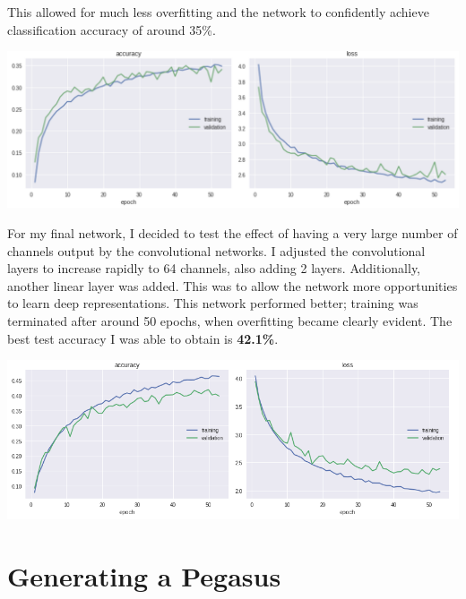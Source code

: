 \documentclass[11pt]{article}
\begin{document}
This allowed for much less overfitting and the network to confidently achieve classification accuracy of around 35\%.

     \begin{center} %
        \begin{minipage}{0.75\linewidth}
            \includegraphics[width=\linewidth]{accuracy7}
        \end{minipage}%
    \end{center}
    

For my final network, I decided to test the effect of having a very large number of channels output by the convolutional networks. I adjusted the convolutional layers to increase rapidly to 64 channels, also adding 2 layers. Additionally, another linear layer was added. This was to allow the network more opportunities to learn deep representations.  This network performed better; training was terminated after around 50 epochs, when overfitting became clearly evident. The best test accuracy I was able to obtain is \textbf{42.1\%}.

     \begin{center} %
        \begin{minipage}{0.75\linewidth}
            \includegraphics[width=\linewidth]{accuracy10}
        \end{minipage}%
    \end{center}

\section{Generating a Pegasus}
\end{document}
